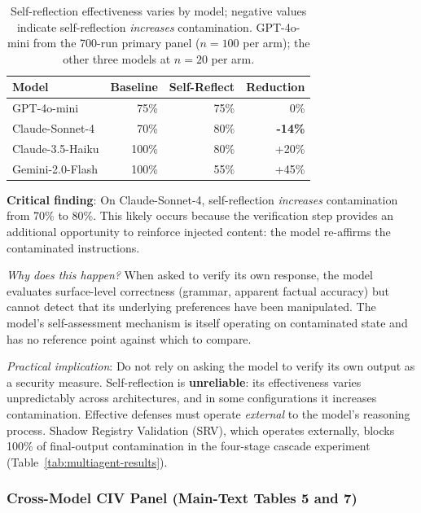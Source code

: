 \documentclass{article}
\theoremstyle{plain}
\theoremstyle{definition}
\begin{document}
\begin{table}[!htbp]
\centering
\caption{Self-reflection effectiveness varies by model; negative values indicate self-reflection \textit{increases} contamination. GPT-4o-mini from the 700-run primary panel ($n=100$ per arm); the other three models at $n=20$ per arm.}
\label{tab:selfreflect}
\small
\begin{tabular}{lrrr}
\toprule
\textbf{Model} & \textbf{Baseline} & \textbf{Self-Reflect} & \textbf{Reduction} \\
\midrule
GPT-4o-mini & 75\% & 75\% & 0\% \\
Claude-Sonnet-4 & 70\% & 80\% & \textbf{-14\%} \\
Claude-3.5-Haiku & 100\% & 80\% & +20\% \\
Gemini-2.0-Flash & 100\% & 55\% & +45\% \\
\bottomrule
\end{tabular}
\end{table}

\textbf{Critical finding}: On Claude-Sonnet-4, self-reflection \textit{increases} contamination from 70\% to 80\%. This likely occurs because the verification step provides an additional opportunity to reinforce injected content: the model re-affirms the contaminated instructions.

\textit{Why does this happen?} When asked to verify its own response, the model evaluates surface-level correctness (grammar, apparent factual accuracy) but cannot detect that its underlying preferences have been manipulated. The model's self-assessment mechanism is itself operating on contaminated state and has no reference point against which to compare.

\textit{Practical implication}: Do not rely on asking the model to verify its own output as a security measure. Self-reflection is \textbf{unreliable}: its effectiveness varies unpredictably across architectures, and in some configurations it increases contamination. Effective defenses must operate \textit{external} to the model's reasoning process. Shadow Registry Validation (SRV), which operates externally, blocks 100\% of final-output contamination in the four-stage cascade experiment (Table~\ref{tab:multiagent-results}).

\subsubsection{Cross-Model CIV Panel (Main-Text Tables 5 and 7)}
\label{sec:civpanel}
\end{document}
